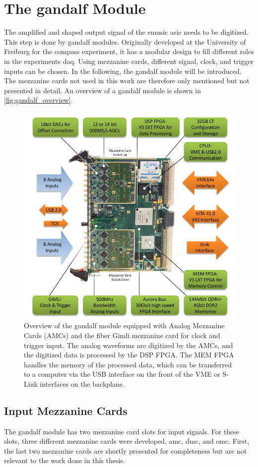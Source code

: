 \section{The \ac{gandalf} Module}
The amplified and shaped output signal of the \ac{emusic} \ac{asic} needs to be digitized.
This step is done by \ac{gandalf} modules.
Originally developed at the University of Freiburg for the \ac{compass} experiment, it has a modular design to fill different roles in the experiments \ac{daq}.
Using mezzanine cards, different signal, clock, and trigger inputs can be chosen.
In the following, the \ac{gandalf} module will be introduced.
The mezzanine cards not used in this work are therefore only mentioned but not presented in detail.
An overview of a \ac{gandalf} module is shown in \autoref{fig:gandalf_overview}.
\begin{figure}
	\centering
	\includegraphics[width=.8\textwidth]{pictures/gandalf_overview.png}
	\caption[Overview of the GANDALF module]{Overview of the \ac{gandalf} module equipped with Analog Mezzanine Cards (AMCs) and the fiber Gimli mezzanine card for clock and trigger input. The analog waveforms are digitized by the AMCs, and the digitized data is processed by the DSP FPGA. The MEM FPGA handles the memory of the processed data, which can be transferred to a computer via the USB interface on the front of the VME or S-Link interfaces on the backplane. \cite{herrmann}}
	\label{fig:gandalf_overview}
\end{figure}

\subsection{Input Mezzanine Cards}
The \ac{gandalf} module has two mezzanine card slots for input signals.
For these slots, three different mezzanine cards were developed, \ac{amc}, \ac{dmc}, and \ac{omc}.
First, the last two mezzanine cards are shortly presented for completeness but are not relevant to the work done in this thesis.

